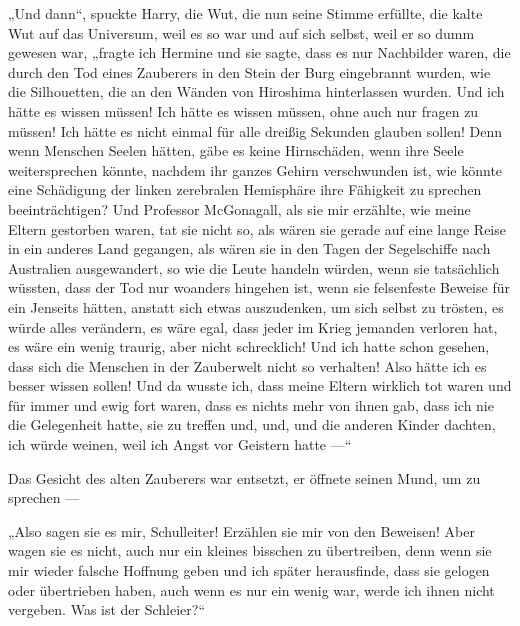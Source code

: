 „Und dann“, spuckte Harry, die Wut, die nun seine Stimme erfüllte, die kalte Wut auf das Universum, weil es so war und auf sich selbst, weil er so dumm gewesen war, „fragte ich Hermine und sie sagte, dass es nur Nachbilder waren, die durch den Tod eines Zauberers in den Stein der Burg eingebrannt wurden, wie die Silhouetten, die an den Wänden von Hiroshima hinterlassen wurden. Und ich hätte es wissen müssen! Ich hätte es wissen müssen, ohne auch nur fragen zu müssen! Ich hätte es nicht einmal für alle dreißig Sekunden glauben sollen! Denn wenn Menschen Seelen hätten, gäbe es keine Hirnschäden, wenn ihre Seele weitersprechen könnte, nachdem ihr ganzes Gehirn verschwunden ist, wie könnte eine Schädigung der linken zerebralen Hemisphäre ihre Fähigkeit zu sprechen beeinträchtigen? Und Professor McGonagall, als sie mir erzählte, wie meine Eltern gestorben waren, tat sie nicht so, als wären sie gerade auf eine lange Reise in ein anderes Land gegangen, als wären sie in den Tagen der Segelschiffe nach Australien ausgewandert, so wie die Leute handeln würden, wenn sie tatsächlich wüssten, dass der Tod nur woanders hingehen ist, wenn sie felsenfeste Beweise für ein Jenseits hätten, anstatt sich etwas auszudenken, um sich selbst zu trösten, es würde alles verändern, es wäre egal, dass jeder im Krieg jemanden verloren hat, es wäre ein wenig traurig, aber nicht schrecklich! Und ich hatte schon gesehen, dass sich die Menschen in der Zauberwelt nicht so verhalten! Also hätte ich es besser wissen sollen! Und da wusste ich, dass meine Eltern wirklich tot waren und für immer und ewig fort waren, dass es nichts mehr von ihnen gab, dass ich nie die Gelegenheit hatte, sie zu treffen und, und, und die anderen Kinder dachten, ich würde weinen, weil ich Angst vor Geistern hatte —“

Das Gesicht des alten Zauberers war entsetzt, er öffnete seinen Mund, um zu sprechen —

„Also sagen sie es mir, Schulleiter! Erzählen sie mir von den Beweisen! Aber wagen sie es nicht, auch nur ein kleines bisschen zu übertreiben, denn wenn sie mir wieder falsche Hoffnung geben und ich später herausfinde, dass sie gelogen oder übertrieben haben, auch wenn es nur ein wenig war, werde ich ihnen nicht vergeben. Was ist der Schleier?“


